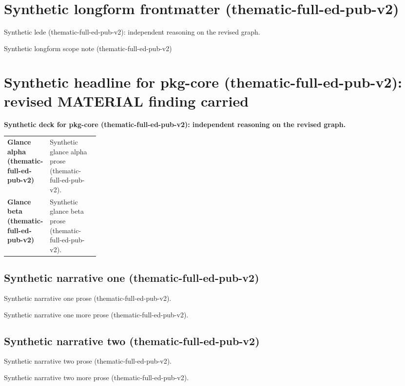 \documentclass[lualatex,a4paper,10pt]{jlreq}
\begin{document}
\surveycover
\clearpage
\section*{Synthetic longform frontmatter (thematic-full-ed-pub-v2)}
Synthetic lede (thematic-full-ed-pub-v2): independent reasoning on the revised graph.

\begin{claimboundary}
\noindent Synthetic longform scope note (thematic-full-ed-pub-v2)\par
\end{claimboundary}
\medskip
\tableofcontents
\clearpage
\Needspace{0.24\textheight}
\section{Synthetic headline for pkg-core (thematic-full-ed-pub-v2): revised MATERIAL finding carried}
\label{pkg:pkg-core}
\noindent\textbf{Synthetic deck for pkg-core (thematic-full-ed-pub-v2): independent reasoning on the revised graph.} \cite{sp001lnd001}\par\medskip
\begin{themeoverview}
\begin{tabularx}{\linewidth}{@{}>{\bfseries}p{0.22\linewidth}X@{}}
Glance alpha (thematic-full-ed-pub-v2) & Synthetic glance alpha prose (thematic-full-ed-pub-v2). \cite{sp001lnd001} \\
Glance beta (thematic-full-ed-pub-v2) & Synthetic glance beta prose (thematic-full-ed-pub-v2). \cite{sp001lnd001} \\
\end{tabularx}
\end{themeoverview}
\medskip
\begin{multicols}{2}
\subsection*{Synthetic narrative one (thematic-full-ed-pub-v2)}
\noindent Synthetic narrative one prose (thematic-full-ed-pub-v2). \cite{sp001lnd001}\par\medskip
\noindent Synthetic narrative one more prose (thematic-full-ed-pub-v2). \cite{sp001lnd001}\par\medskip
\subsection*{Synthetic narrative two (thematic-full-ed-pub-v2)}
\noindent Synthetic narrative two prose (thematic-full-ed-pub-v2). \cite{sp001lnd001}\par\medskip
\noindent Synthetic narrative two more prose (thematic-full-ed-pub-v2). \cite{sp001lnd001}\par\medskip
\end{multicols}
\end{document}
